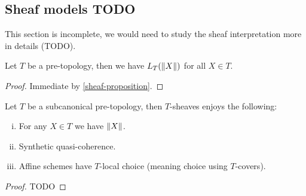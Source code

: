 \subsection{Sheaf models TODO}

This section is incomplete, we would need to study the sheaf interpretation more in details (TODO).

\begin{lemma}\label{cover-are-surjective}
Let $T$ be a pre-topology, then we have $L_T(\lVert X \rVert)$ for all $X\in T$.
\end{lemma}

\begin{proof}
Immediate by \cref{sheaf-proposition}.
\end{proof}

\begin{theorem}
Let $T$ be a subcanonical pre-topology, then $T$-sheaves enjoys the following:
\begin{enumerate}[(i)]
\item For any $X\in T$ we have $\lVert X \rVert$.
\item Synthetic quasi-coherence.
\item Affine schemes have $T$-local choice (meaning choice using $T$-covers).
\end{enumerate}
\end{theorem}

\begin{proof}
TODO
\end{proof}




